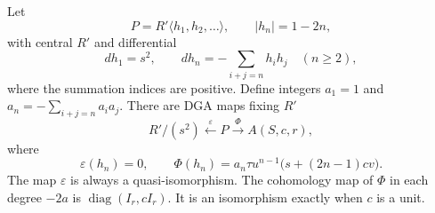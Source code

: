 \begin{proposition}
\label{v4-arith:ks:positive-zigzag}
\ClaimStatusProvedHere{}
Let
\[
 P=R'\langle h_1,h_2,\ldots\rangle,\qquad |h_n|=1-2n,
\]
with central $R'$ and differential
\[
 dh_1=s^2,\qquad dh_n=-\sum_{i+j=n}h_ih_j\quad(n\geq2),
\]
where the summation indices are positive.
Define integers $a_1=1$ and $a_n=-\sum_{i+j=n}a_ia_j$.
There are DGA maps fixing $R'$
\[
 R'/(s^2)\xleftarrow{\ \varepsilon\ }P
       \xrightarrow{\ \Phi\ }A(S,c,r),
\]
where
\[
 \varepsilon(h_n)=0,\qquad
 \Phi(h_n)=a_n\tau u^{n-1}\bigl(s+(2n-1)cv\bigr).
\]
The map $\varepsilon$ is always a quasi-isomorphism.
The cohomology map of $\Phi$ in each degree $-2a$ is
$\operatorname{diag}(I_r,cI_r)$.
It is an isomorphism exactly when $c$ is a unit.
\end{proposition}

